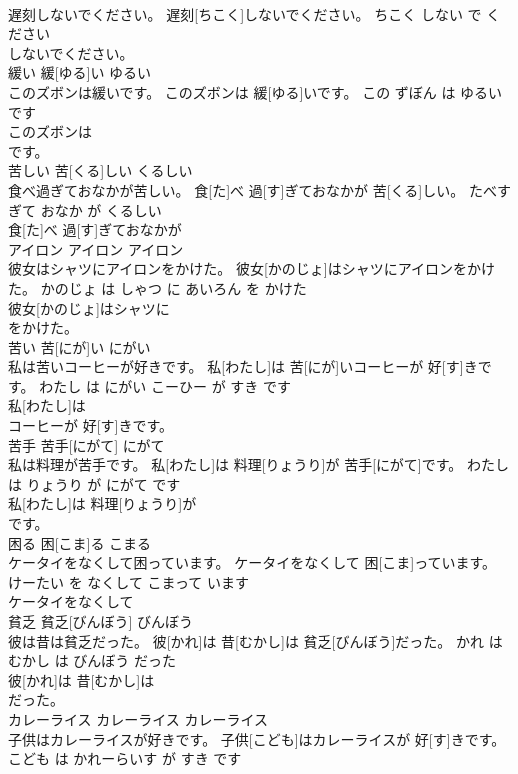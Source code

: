 \documentclass[8pt]{extreport}
\begin{document}
\begin{CJK}{UTF8}{min}
\\	遅刻しないでください。	遅刻[ちこく]しないでください。	ちこく しない で ください	
\\	しないでください。			
\\	緩い	緩[ゆる]い	ゆるい	
\\	このズボンは緩いです。	このズボンは 緩[ゆる]いです。	この ずぼん は ゆるい です	
\\	このズボンは
\\	です。			
\\	苦しい	苦[くる]しい	くるしい	
\\	食べ過ぎておなかが苦しい。	食[た]べ 過[す]ぎておなかが 苦[くる]しい。	たべすぎて おなか が くるしい	
\\	食[た]べ 過[す]ぎておなかが
\\	アイロン	アイロン	アイロン	
\\	彼女はシャツにアイロンをかけた。	彼女[かのじょ]はシャツにアイロンをかけた。	かのじょ は しゃつ に あいろん を かけた	
\\	彼女[かのじょ]はシャツに
\\	をかけた。			
\\	苦い	苦[にが]い	にがい	
\\	私は苦いコーヒーが好きです。	私[わたし]は 苦[にが]いコーヒーが 好[す]きです。	わたし は にがい こーひー が すき です	
\\	私[わたし]は
\\	コーヒーが 好[す]きです。			
\\	苦手	苦手[にがて]	にがて	
\\	私は料理が苦手です。	私[わたし]は 料理[りょうり]が 苦手[にがて]です。	わたし は りょうり が にがて です	
\\	私[わたし]は 料理[りょうり]が
\\	です。			
\\	困る	困[こま]る	こまる	
\\	ケータイをなくして困っています。	ケータイをなくして 困[こま]っています。	けーたい を なくして こまって います	
\\	ケータイをなくして
\\	貧乏	貧乏[びんぼう]	びんぼう	
\\	彼は昔は貧乏だった。	彼[かれ]は 昔[むかし]は 貧乏[びんぼう]だった。	かれ は むかし は びんぼう だった	
\\	彼[かれ]は 昔[むかし]は
\\	だった。			
\\	カレーライス	カレーライス	カレーライス	
\\	子供はカレーライスが好きです。	子供[こども]はカレーライスが 好[す]きです。	こども は かれーらいす が すき です	

\end{CJK}
\end{document}
